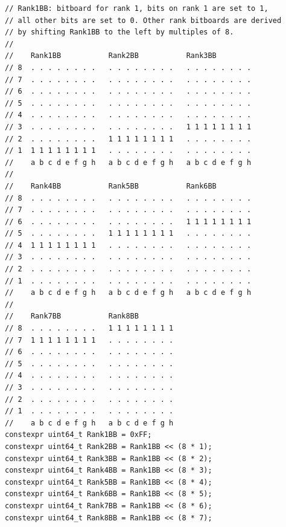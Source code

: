 \documentclass[12pt,a4paper,twoside,openright]{book}
\begin{document}
\begin{mdframed}[skipabove=\baselineskip,topline=false,rightline=false,bottomline=false,leftline=false,linewidth=1pt,linecolor=gray!40,innerleftmargin=8pt]
\begin{verbatim}
// Rank1BB: bitboard for rank 1, bits on rank 1 are set to 1,
// all other bits are set to 0. Other rank bitboards are derived
// by shifting Rank1BB to the left by multiples of 8.
//
//    Rank1BB           Rank2BB           Rank3BB
// 8  . . . . . . . .   . . . . . . . .   . . . . . . . .
// 7  . . . . . . . .   . . . . . . . .   . . . . . . . .
// 6  . . . . . . . .   . . . . . . . .   . . . . . . . .
// 5  . . . . . . . .   . . . . . . . .   . . . . . . . .
// 4  . . . . . . . .   . . . . . . . .   . . . . . . . .
// 3  . . . . . . . .   . . . . . . . .   1 1 1 1 1 1 1 1
// 2  . . . . . . . .   1 1 1 1 1 1 1 1   . . . . . . . .
// 1  1 1 1 1 1 1 1 1   . . . . . . . .   . . . . . . . .
//    a b c d e f g h   a b c d e f g h   a b c d e f g h
//
//    Rank4BB           Rank5BB           Rank6BB
// 8  . . . . . . . .   . . . . . . . .   . . . . . . . .
// 7  . . . . . . . .   . . . . . . . .   . . . . . . . .
// 6  . . . . . . . .   . . . . . . . .   1 1 1 1 1 1 1 1
// 5  . . . . . . . .   1 1 1 1 1 1 1 1   . . . . . . . .
// 4  1 1 1 1 1 1 1 1   . . . . . . . .   . . . . . . . .
// 3  . . . . . . . .   . . . . . . . .   . . . . . . . .
// 2  . . . . . . . .   . . . . . . . .   . . . . . . . .
// 1  . . . . . . . .   . . . . . . . .   . . . . . . . .
//    a b c d e f g h   a b c d e f g h   a b c d e f g h
//
//    Rank7BB           Rank8BB
// 8  . . . . . . . .   1 1 1 1 1 1 1 1
// 7  1 1 1 1 1 1 1 1   . . . . . . . .
// 6  . . . . . . . .   . . . . . . . .
// 5  . . . . . . . .   . . . . . . . .
// 4  . . . . . . . .   . . . . . . . .
// 3  . . . . . . . .   . . . . . . . .
// 2  . . . . . . . .   . . . . . . . .
// 1  . . . . . . . .   . . . . . . . .
//    a b c d e f g h   a b c d e f g h
constexpr uint64_t Rank1BB = 0xFF;
constexpr uint64_t Rank2BB = Rank1BB << (8 * 1);
constexpr uint64_t Rank3BB = Rank1BB << (8 * 2);
constexpr uint64_t Rank4BB = Rank1BB << (8 * 3);
constexpr uint64_t Rank5BB = Rank1BB << (8 * 4);
constexpr uint64_t Rank6BB = Rank1BB << (8 * 5);
constexpr uint64_t Rank7BB = Rank1BB << (8 * 6);
constexpr uint64_t Rank8BB = Rank1BB << (8 * 7);


\end{verbatim}
\end{mdframed}
\end{document}
